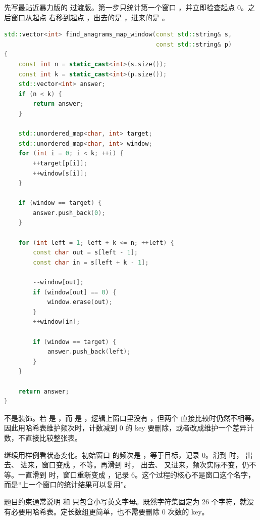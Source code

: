 先写最贴近暴力版的  过渡版。第一步只统计第一个窗口 ，并立即检查起点 0。之后窗口从起点  右移到起点 ，出去的是 ，进来的是 。

\begin{lstlisting}[language=C++,caption={LeetCode 438：从暴力过渡到哈希表滑动窗口}]
std::vector<int> find_anagrams_map_window(const std::string& s,
                                          const std::string& p)
{
    const int n = static_cast<int>(s.size());
    const int k = static_cast<int>(p.size());
    std::vector<int> answer;
    if (n < k) {
        return answer;
    }

    std::unordered_map<char, int> target;
    std::unordered_map<char, int> window;
    for (int i = 0; i < k; ++i) {
        ++target[p[i]];
        ++window[s[i]];
    }

    if (window == target) {
        answer.push_back(0);
    }

    for (int left = 1; left + k <= n; ++left) {
        const char out = s[left - 1];
        const char in = s[left + k - 1];

        --window[out];
        if (window[out] == 0) {
            window.erase(out);
        }
        ++window[in];

        if (window == target) {
            answer.push_back(left);
        }
    }

    return answer;
}
\end{lstlisting}

 不是装饰。若  是 ，而  是 ，逻辑上窗口里没有 ，但两个  直接比较时仍然不相等。因此用哈希表维护频次时，计数减到 0 的 key 要删除，或者改成维护一个差异计数，不直接比较整张表。

继续用样例看状态变化。初始窗口  的频次是 ，等于目标，记录 0。滑到  时， 出去、 进来，窗口变成 ，不等。再滑到  时， 出去、 又进来，频次实际不变，仍不等。一直滑到  时，窗口重新变成 ，记录 6。这个过程的核心不是窗口这个名字，而是“上一个窗口的统计结果可以复用”。

题目约束通常说明  和  只包含小写英文字母。既然字符集固定为 26 个字符，就没有必要用哈希表。定长数组更简单，也不需要删除 0 次数的 key。

